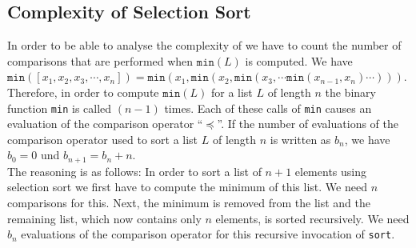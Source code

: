 \subsection{Complexity of Selection Sort}
In order to be able to analyse the complexity of  we have to count the number
of comparisons that are performed when $\mathtt{min}(L)$ is computed.  We have 
\\[0.2cm]
\hspace*{1.3cm} 
$\mathtt{min}([x_1,x_2,x_3,\cdots,x_n]) = \mathtt{min}(x_1, \mathtt{min}(x_2, \mathtt{min}(x_3, \cdots \mathtt{min}(x_{n-1},x_n) \cdots )))$. 
\\[0.2cm]
Therefore, in order to compute $\texttt{min}(L)$ for a list $L$ of length $n$ the binary function \texttt{min}
is called $(n-1)$ times.  Each of these calls of \texttt{min} causes an evaluation of the comparison
operator ``$\preceq$''.  If the number of evaluations of the comparison operator used to sort a list
$L$ of length $n$ is written as $b_n$, we have \\[0.2cm]
\hspace*{1.3cm}
$b_0 = 0$ \quad und \quad $b_{n+1} = b_n + n$. 
\\[0.2cm]
The reasoning is as follows: In order to sort a list of $n+1$ elements using selection sort we first
have to compute the minimum of this list.  We need $n$ comparisons for this.  Next, the minimum is
removed from the list and the remaining list, which now contains only $n$ elements, is sorted
recursively.  We need $b_n$ evaluations of the comparison operator for this recursive invocation of
\texttt{sort}.

